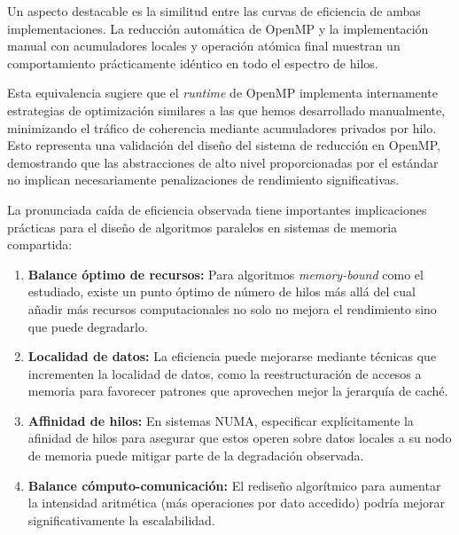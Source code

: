         Un aspecto destacable es la similitud entre las curvas de eficiencia de ambas implementaciones. La reducción automática de OpenMP y la implementación manual con acumuladores locales y operación atómica final muestran un comportamiento prácticamente idéntico en todo el espectro de hilos.
        
        Esta equivalencia sugiere que el \textit{runtime} de OpenMP implementa internamente estrategias de optimización similares a las que hemos desarrollado manualmente, minimizando el tráfico de coherencia mediante acumuladores privados por hilo. Esto representa una validación del diseño del sistema de reducción en OpenMP, demostrando que las abstracciones de alto nivel proporcionadas por el estándar no implican necesariamente penalizaciones de rendimiento significativas.

        La pronunciada caída de eficiencia observada tiene importantes implicaciones prácticas para el diseño de algoritmos paralelos en sistemas de memoria compartida:
        
        \begin{enumerate}
        
           \item \textbf{Balance óptimo de recursos:} Para algoritmos \textit{memory-bound} como el estudiado, existe un punto óptimo de número de hilos más allá del cual añadir más recursos computacionales no solo no mejora el rendimiento sino que puede degradarlo.
           
           \item \textbf{Localidad de datos:} La eficiencia puede mejorarse mediante técnicas que incrementen la localidad de datos, como la reestructuración de accesos a memoria para favorecer patrones que aprovechen mejor la jerarquía de caché.
           
           \item \textbf{Affinidad de hilos:} En sistemas NUMA, especificar explícitamente la afinidad de hilos para asegurar que estos operen sobre datos locales a su nodo de memoria puede mitigar parte de la degradación observada.
           
           \item \textbf{Balance cómputo-comunicación:} El rediseño algorítmico para aumentar la intensidad aritmética (más operaciones por dato accedido) podría mejorar significativamente la escalabilidad.
           
        \end{enumerate}
        
